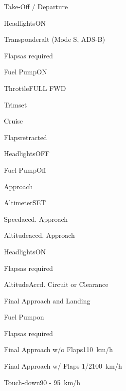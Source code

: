 \begin{checklist}{Take-Off / Departure}
	  \item{Headlights}{ON}
	  \item{Transponder}{alt (Mode S, ADS-B)}
	  \item{Flaps}{as required}
	  \item{Fuel Pump}{ON}
	  \item{Throttle}{FULL FWD}
	\item{Trim}{set}
\end{checklist}
	
\begin{checklist}{Cruise}
	\item{Flaps}{retracted}
	\item{Headlights}{OFF}
	\item{Fuel Pump}{Off} 
	 
\end{checklist}

\begin{checklist}{Approach}
	\item{Altimeter}{SET}
	\item{Speed}{accd. Approach}
	\item{Altitude}{accd. Approach}
	\item{Headlights}{ON}
	\item{Flaps}{as required}
	\item{Altitude}{Accd. Circuit or Clearance}
\end{checklist}

\begin{checklist}{Final Approach and Landing}
	\item{Fuel Pump}{on}
	\item{Flaps}{as required}
	\item{Final Approach w/o Flaps}{110~km/h}
	\item{Final Approach w/ Flaps 1/2}{100~km/h}
	\item{Touch-down}{90 - 95~km/h}
\end{checklist}

